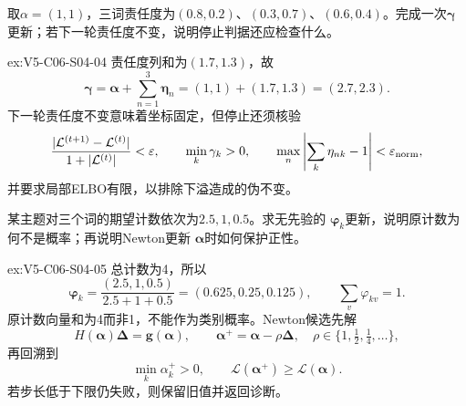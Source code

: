 \begin{SLChapterExercisePairSection}
\begin{exercise}\label{ex:V5-C06-S04-04}
取$\alpha=(1,1)$，三词责任度为$(0.8,0.2)$、$(0.3,0.7)$、$(0.6,0.4)$。完成一次$\boldsymbol\gamma$更新；若下一轮责任度不变，说明停止判据还应检查什么。
\end{exercise}
\ifSLFullEdition
{}\label{sol:V5-C06-S04-04}
\begin{chapterexercisesolution}{ex:V5-C06-S04-04}
\nopagebreak[4]
责任度列和为$(1.7,1.3)$，故
\[
\boldsymbol\gamma
=\boldsymbol\alpha+\sum_{n=1}^{3}\boldsymbol\eta_n
=(1,1)+(1.7,1.3)=(2.7,2.3).
\]
下一轮责任度不变意味着坐标固定，但停止还须核验
\[
\frac{|\mathcal L^{(t+1)}-\mathcal L^{(t)}|}
{1+|\mathcal L^{(t)}|}<\varepsilon,\qquad
\min_k\gamma_k>0,\qquad
\max_n\left|\sum_k\eta_{nk}-1\right|<\varepsilon_{\rm norm},
\]
并要求局部ELBO有限，以排除下溢造成的伪不变。
\end{chapterexercisesolution}
\fi

\begin{exercise}\label{ex:V5-C06-S04-05}
某主题对三个词的期望计数依次为$2.5,1,0.5$。求无先验的
$\boldsymbol\varphi_k$更新，说明原计数为何不是概率；再说明Newton更新
$\boldsymbol\alpha$时如何保护正性。
\end{exercise}
\ifSLFullEdition
{}\label{sol:V5-C06-S04-05}
\begin{chapterexercisesolution}{ex:V5-C06-S04-05}
\nopagebreak[4]
总计数为4，所以
\[
\boldsymbol\varphi_k
=\frac{(2.5,1,0.5)}{2.5+1+0.5}
=(0.625,0.25,0.125),\qquad
\sum_v\varphi_{kv}=1.
\]
原计数向量和为4而非1，不能作为类别概率。Newton候选先解
\[
H(\boldsymbol\alpha)\boldsymbol\Delta
=\boldsymbol g(\boldsymbol\alpha),\qquad
\boldsymbol\alpha^{+}
=\boldsymbol\alpha-\rho\boldsymbol\Delta,\quad
\rho\in\{1,\tfrac12,\tfrac14,\ldots\},
\]
再回溯到
\[
\min_k\alpha_k^{+}>0,\qquad
\mathcal L(\boldsymbol\alpha^{+})\ge\mathcal L(\boldsymbol\alpha).
\]
若步长低于下限仍失败，则保留旧值并返回诊断。
\end{chapterexercisesolution}
\fi


\end{SLChapterExercisePairSection}
